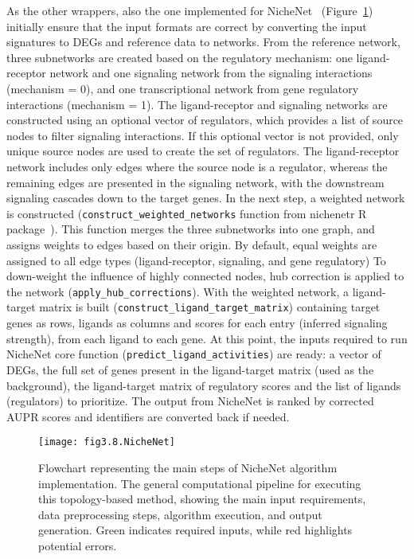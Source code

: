 As the other wrappers, also the one implemented for NicheNet~\cite{RN42} (Figure~\ref{fig:fig3.8.NicheNet}) initially ensure that the input formats are correct by converting the input signatures to \gls{DEGs} and reference data to networks.
From the reference network, three subnetworks are created based on the regulatory mechanism: one ligand-receptor network and one signaling network from the signaling interactions (mechanism = 0), and one transcriptional network from gene regulatory interactions (mechanism = 1).
The ligand-receptor and signaling networks are constructed using an optional vector of regulators, which provides a list of source nodes to filter signaling interactions.
If this optional vector is not provided, only unique source nodes are used to create the set of regulators.
The ligand-receptor network includes only edges where the source node is a regulator, whereas the remaining edges are presented in the signaling network, with the downstream signaling cascades down to the target genes.
In the next step, a weighted network is constructed (\texttt{construct\_weighted\_networks} function from nichenetr \gls{R} package~\cite{RN42}).
This function merges the three subnetworks into one graph, and assigns weights to edges based on their origin. By default, equal weights are assigned to all edge types (ligand-receptor, signaling, and gene regulatory)
To down-weight the influence of highly connected nodes, hub correction is applied to the network (\texttt{apply\_hub\_corrections}).
With the weighted network, a ligand-target matrix is built (\texttt{construct\_ligand\_target\_matrix}) containing target genes as rows, ligands as columns and scores for each entry (inferred signaling strength), from each ligand to each gene.
At this point, the inputs required to run NicheNet core function (\texttt{predict\_ligand\_activities}) are ready: a vector of \gls{DEGs}, the full set of genes present in the ligand-target matrix (used as the background), the ligand-target matrix of regulatory scores and the list of ligands (regulators) to prioritize.
The output from NicheNet is ranked by corrected \gls{AUPR} scores and identifiers are converted back if needed.

\begin{figure}[htbp]
    \centering
    \texttt{[image: fig3.8.NicheNet]}
    \caption[Flowchart representing the main steps of NicheNet algorithm implementation.]{Flowchart representing the main steps of NicheNet algorithm implementation. The general computational pipeline for executing this topology-based method, showing the main input requirements, data preprocessing steps, algorithm execution, and output generation. Green indicates required inputs, while red highlights potential errors.}
    \label{fig:fig3.8.NicheNet}
\end{figure}

